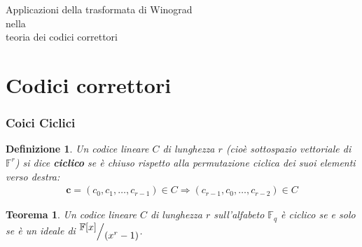 \documentclass[mathserif]{beamer}
\def\quotient#1#2{%
   \raise1ex\hbox{$#1$}\Big/\lower1ex\hbox{$#2$}%
}
\newtheorem{definizione}{Definizione}
\newtheorem{teorema}{Teorema}
\newtheorem{prop}{Proprietà}
\begin{document}



\thispagestyle{empty}
\begin{frame}
   \begin{center}
      Applicazioni della trasformata di Winograd \\
      nella\\
      teoria dei codici correttori
   \end{center}
\end{frame}

\section{Codici correttori}
\begin{frame}
  \frametitle{Coici Ciclici} 
    \begin{definizione}
    Un codice lineare $C$ di lunghezza $r$ (cioè sottospazio vettoriale di $\mathbb{F}^{r}$) si dice {\bf ciclico} se è chiuso rispetto alla permutazione ciclica dei suoi elementi verso destra:
    \begin{align*}
	\mathbf{c} = (c_{0},c_{1}, \dots , c_{r-1}) \in C \Longrightarrow (c_{r-1},c_{0}, \dots , c_{r-2}) \in C 
    \end{align*}
    \end{definizione}
    \begin{teorema}
      Un codice lineare $C$ di lunghezza $r$ sull'alfabeto $\mathbb{F}_{q}$ è ciclico se e solo se è un ideale di $\quotient{\mathbb{F} \lbrack x \rbrack  }{ (x^{r} - 1)}$. 
    \end{teorema}
\end{frame}
\end{document}
